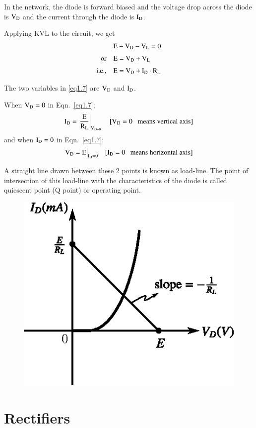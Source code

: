 In the network, the diode is forward biased and the voltage drop across the diode is $\textrm{V}_{\textrm{D}}$ and the current through the diode is $\textrm{I}_{\textrm{D}}$.

Applying KVL to the circuit, we get
\begin{align}
& \textrm{E} -\textrm{V}_{\textrm{D}}-\textrm{V}_{\textrm{L}}=0\notag\\[3pt]
\text{or}\quad &\textrm{E}=\textrm{V}_{\textrm{D}}+\textrm{V}_{\textrm{L}}\notag\\[3pt]
\text{i.e.,}\quad &\textrm{E}=\textrm{V}_{\textrm{D}}+\textrm{I}_{\textrm{D}}\cdot \textrm{R}_{\textrm{L}}\label{eq1.7}
\end{align}

The two variables in \eqref{eq1.7} are $\textrm{V}_{\textrm{D}}$ and $\textrm{I}_{\textrm{D}}$.

When $\textrm{V}_{\textrm{D}}=0$ in Eqn.~\eqref{eq1.7}; 
$$
\textrm{I}_{\textrm{D}}=\left. \dfrac{\textrm{E}}{\textrm{R}_{\textrm{L}}}\right|_{\textrm{V}_{\textrm{D}=0}}\quad [\textrm{V}_{\textrm{D}}=0\text{~~ means vertical axis}]
$$
and when $\textrm{I}_{\textrm{D}}=0$ in Eqn.~\eqref{eq1.7};
$$
\textrm{V}_{\textrm{D}}=\textrm{E}\big|_{\textrm{I}_{\textrm{D}}=0}\quad [\textrm{I}_{\textrm{D}}=0\text{~~ means horizontal axis}]
$$

A straight line drawn between these 2 points is known as load-line. The point of intersection of this load-line with the characteristics of the diode is called quiescent point (Q point) or operating point.
\begin{figure}[H]
\centering
\includegraphics{chap1/fig1.28.eps}
\caption{}\label{fig1.28}
\end{figure}

\section{Rectifiers}\label{sec1.10}

